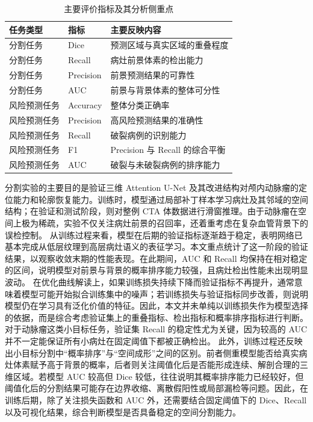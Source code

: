 \begin{table}[htbp]
\centering
\caption{主要评价指标及其分析侧重点}
\label{tab:metric_summary}
\small
\begin{tabular}{lll}
\toprule
任务类型 & 指标 & 主要反映内容 \\
\midrule
分割任务 & Dice & 预测区域与真实区域的重叠程度 \\
分割任务 & Recall & 病灶前景体素的检出能力 \\
分割任务 & Precision & 前景预测结果的可靠性 \\
分割任务 & AUC & 前景与背景体素的整体可分性 \\
风险预测任务 & Accuracy & 整体分类正确率 \\
风险预测任务 & Precision & 高风险预测结果的准确性 \\
风险预测任务 & Recall & 破裂病例的识别能力 \\
风险预测任务 & F1 & Precision 与 Recall 的综合平衡 \\
风险预测任务 & AUC & 破裂与未破裂病例的排序能力 \\
\bottomrule
\end{tabular}
\normalsize
\end{table}


分割实验的主要目的是验证三维 Attention U-Net 及其改进结构对颅内动脉瘤的定位能力和轮廓恢复能力。训练时，模型通过局部补丁样本学习病灶及其邻域的空间结构；在验证和测试阶段，则对整例 CTA 体数据进行滑窗推理。由于动脉瘤在空间上极为稀疏，实验不仅关注病灶前景的召回率，还着重考虑在复杂血管背景下的误检控制。
从训练过程来看，模型在后期的验证指标逐渐趋于稳定，表明网络已基本完成从低层纹理到高层病灶语义的表征学习。本文重点统计了这一阶段的验证结果，以观察收敛末期的性能表现。在此期间，AUC 和 Recall 均保持在相对稳定的区间，说明模型对前景与背景的概率排序能力较强，且病灶检出性能未出现明显波动。
在优化曲线解读上，如果训练损失持续下降而验证指标不再提升，通常意味着模型可能开始拟合训练集中的噪声；若训练损失与验证指标同步改善，则说明模型仍在学习具有泛化价值的特征。因此，本文并未单纯以训练损失作为模型选择的依据，而是综合考虑验证集上的重叠指标、检出指标和概率排序指标进行判断。对于动脉瘤这类小目标任务，验证集 Recall 的稳定性尤为关键，因为较高的 AUC 并不一定能保证所有小病灶在固定阈值下都被正确检出。
此外，训练过程还反映出小目标分割中“概率排序”与“空间成形”之间的区别。前者侧重模型能否给真实病灶体素赋予高于背景的概率，后者则关注阈值化后是否能形成连续、解剖合理的三维区域。若模型 AUC 较高但 Dice 较低，往往说明其概率排序能力已经较好，但阈值化后的分割结果可能存在边界收缩、离散假阳性或局部漏检等问题。因此，在训练后期，除了关注损失函数和 AUC 外，还需要结合固定阈值下的 Dice、Recall 以及可视化结果，综合判断模型是否具备稳定的空间分割能力。


